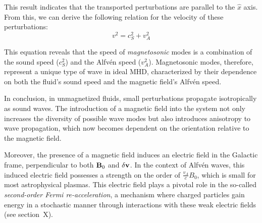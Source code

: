 This result indicates that the transported perturbations are parallel to the \(\hat{x}\) axis. From this, we can derive the following relation for the velocity of these perturbations:
%
\begin{equation}
v^2 = c_S^2 + v_A^2
\end{equation}

This equation reveals that the speed of \emph{magnetosonic} modes is a combination of the sound speed (\(c_S^2\)) and the Alfvén speed (\(v_A^2\)). Magnetosonic modes, therefore, represent a unique type of wave in ideal MHD, characterized by their dependence on both the fluid's sound speed and the magnetic field's Alfvén speed.

In conclusion, in unmagnetized fluids, small perturbations propagate isotropically as sound waves. The introduction of a magnetic field into the system not only increases the diversity of possible wave modes but also introduces anisotropy to wave propagation, which now becomes dependent on the orientation relative to the magnetic field. 

Moreover, the presence of a magnetic field induces an electric field in the Galactic frame, perpendicular to both \(\vb{B}_0\) and \(\delta \vb{v}\). In the context of Alfvén waves, this induced electric field possesses a strength on the order of \(\frac{v_A}{c} B_0\), which is small for most astrophysical plasmas. This electric field plays a pivotal role in the so-called \emph{second-order Fermi re-acceleration}, a mechanism where charged particles gain energy in a stochastic manner through interactions with these weak electric fields (see section~X).


